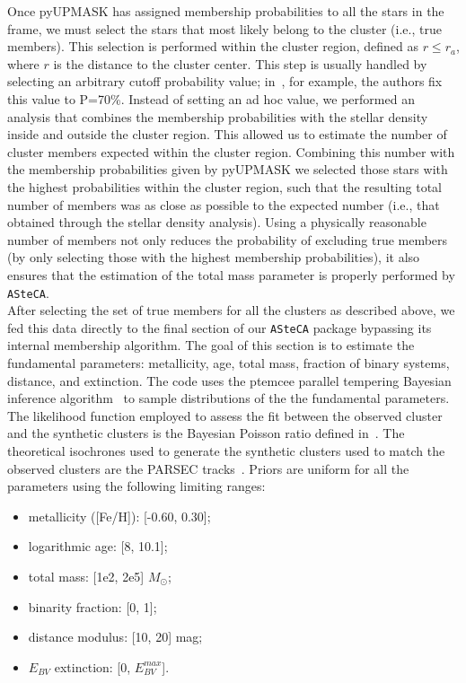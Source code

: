 \documentclass{aa}
\begin{document}
  Once pyUPMASK has assigned membership probabilities to all the stars in the
  frame, we must select the  stars that most likely belong to the
  cluster (i.e., true members). This selection is performed within the
  cluster region, defined as $r\leq r_{a}$, where $r$ is the distance to the
  cluster center.
  This step is usually handled by selecting
  an arbitrary cutoff probability value; in~\cite{Cantat_2020}, for example,
  the authors fix this value to P=70\%. Instead of setting an ad hoc value, we
  performed an analysis that combines the membership probabilities with the
  stellar density inside and outside  the cluster region. This allowed us to
  estimate the number of cluster members expected within the cluster region.
  Combining this number with the membership probabilities given by pyUPMASK we
  selected those stars with the highest probabilities within the cluster region,
  such that the resulting total number of members was as close as possible to the
  expected number (i.e., that obtained through the stellar density analysis).
  Using a physically reasonable number of members not only reduces the
  probability of excluding true members (by only selecting those with the
  highest membership probabilities), it also ensures that the estimation of the
  total mass parameter is properly performed by \texttt{ASteCA}.\\

  After selecting the set of true members for all the clusters as described
  above, we fed this data directly to the final section of our 
  \texttt{ASteCA} package bypassing its internal membership algorithm. 
  The goal of this section is  to estimate
  the fundamental parameters: metallicity, age, total mass, fraction of binary
  systems, distance, and extinction. The code uses the ptemcee parallel
  tempering Bayesian inference algorithm~\citep{ptemcee} to sample distributions of the  the
  fundamental parameters. The likelihood function employed to
  assess the fit between the observed cluster and the synthetic clusters is the
  Bayesian Poisson ratio defined in~\cite{Tremmel_2013}.
  The theoretical isochrones used to generate the
  synthetic clusters used to match the observed clusters are the PARSEC
  tracks~\citep{Bressan_2012}. Priors are uniform for all the parameters using
  the following limiting ranges: \begin{itemize}
   \item metallicity ([Fe/H]): [-0.60, 0.30];
   \item logarithmic age: [8, 10.1];
   \item total mass: [1e2, 2e5] $M_{\odot}$;
   \item binarity fraction: [0, 1];
   \item distance modulus: [10, 20] mag;
   \item $E_{BV}$ extinction: [0, $E_{BV}^{max}$].
  \end{itemize}
\end{document}

